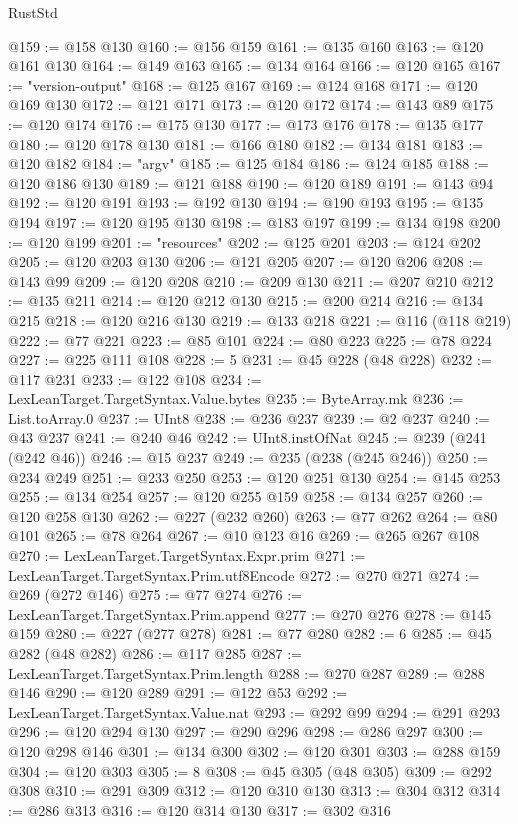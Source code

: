 \begin{lexlean}{RustStd}
\begin{coremodule}
{\begin{coremodule}
{{{{{{{{{{{{{{{{{{{{{{{{{{{{{{{{{{{{{{{{{{{{{{{{{{{{{{{{{{{{@159 := @158 @130
@160 := @156 @159
@161 := @135 @160
@163 := @120 @161 @130
@164 := @149 @163
@165 := @134 @164
@166 := @120 @165
@167 := "version-output"
@168 := @125 @167
@169 := @124 @168
@171 := @120 @169 @130
@172 := @121 @171
@173 := @120 @172
@174 := @143 @89
@175 := @120 @174
@176 := @175 @130
@177 := @173 @176
@178 := @135 @177
@180 := @120 @178 @130
@181 := @166 @180
@182 := @134 @181
@183 := @120 @182
@184 := "argv"
@185 := @125 @184
@186 := @124 @185
@188 := @120 @186 @130
@189 := @121 @188
@190 := @120 @189
@191 := @143 @94
@192 := @120 @191
@193 := @192 @130
@194 := @190 @193
@195 := @135 @194
@197 := @120 @195 @130
@198 := @183 @197
@199 := @134 @198
@200 := @120 @199
@201 := "resources"
@202 := @125 @201
@203 := @124 @202
@205 := @120 @203 @130
@206 := @121 @205
@207 := @120 @206
@208 := @143 @99
@209 := @120 @208
@210 := @209 @130
@211 := @207 @210
@212 := @135 @211
@214 := @120 @212 @130
@215 := @200 @214
@216 := @134 @215
@218 := @120 @216 @130
@219 := @133 @218
@221 := @116 (@118 @219)
@222 := @77 @221
@223 := @85 @101
@224 := @80 @223
@225 := @78 @224
@227 := @225 @111 @108
@228 := 5
@231 := @45 @228 (@48 @228)
@232 := @117 @231
@233 := @122 @108
@234 := LexLeanTarget.TargetSyntax.Value.bytes
@235 := ByteArray.mk
@236 := List.toArray.{0}
@237 := UInt8
@238 := @236 @237
@239 := @2 @237
@240 := @43 @237
@241 := @240 @46
@242 := UInt8.instOfNat
@245 := @239 (@241 (@242 @46))
@246 := @15 @237
@249 := @235 (@238 (@245 @246))
@250 := @234 @249
@251 := @233 @250
@253 := @120 @251 @130
@254 := @145 @253
@255 := @134 @254
@257 := @120 @255 @159
@258 := @134 @257
@260 := @120 @258 @130
@262 := @227 (@232 @260)
@263 := @77 @262
@264 := @80 @101
@265 := @78 @264
@267 := @10 @123 @16
@269 := @265 @267 @108
@270 := LexLeanTarget.TargetSyntax.Expr.prim
@271 := LexLeanTarget.TargetSyntax.Prim.utf8Encode
@272 := @270 @271
@274 := @269 (@272 @146)
@275 := @77 @274
@276 := LexLeanTarget.TargetSyntax.Prim.append
@277 := @270 @276
@278 := @145 @159
@280 := @227 (@277 @278)
@281 := @77 @280
@282 := 6
@285 := @45 @282 (@48 @282)
@286 := @117 @285
@287 := LexLeanTarget.TargetSyntax.Prim.length
@288 := @270 @287
@289 := @288 @146
@290 := @120 @289
@291 := @122 @53
@292 := LexLeanTarget.TargetSyntax.Value.nat
@293 := @292 @99
@294 := @291 @293
@296 := @120 @294 @130
@297 := @290 @296
@298 := @286 @297
@300 := @120 @298 @146
@301 := @134 @300
@302 := @120 @301
@303 := @288 @159
@304 := @120 @303
@305 := 8
@308 := @45 @305 (@48 @305)
@309 := @292 @308
@310 := @291 @309
@312 := @120 @310 @130
@313 := @304 @312
@314 := @286 @313
@316 := @120 @314 @130
@317 := @302 @316
}}}}}}}}}}}}}}}}}}}}}}}}}}}}}}}}}}}}}}}}}}}}}}}}}}}}}}}}}}}}
\end{coremodule}}
\end{coremodule}
\end{lexlean}
